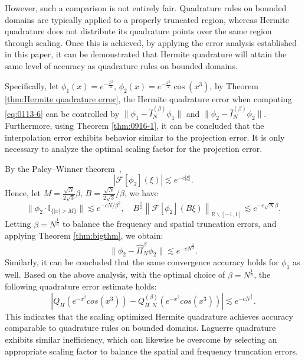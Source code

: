\documentclass[pdflatex,sn-aps]{sn-jnl}%
\theoremstyle{thmstyleone}%
\theoremstyle{thmstyletwo}%
\theoremstyle{thmstylethree}%
\begin{document}
However, such a comparison is not entirely fair. 
Quadrature rules on bounded domains are typically applied to a properly truncated region, 
whereas Hermite quadrature does not distribute its quadrature points over the same region through scaling.
Once this is achieved, by applying the error analysis established in this paper, 
it can be demonstrated that Hermite quadrature will attain the same level of accuracy as quadrature rules on bounded domains.

Specifically, let $\phi_1(x) = e^{-\frac{x^2}{2}}$, $\phi_2(x) = e^{-\frac{x^2}{2}} \cos(x^3)$, 
by Theorem \ref{thm:Hermite quadrature error}, the Hermite quadrature error when computing
\eqref{eq:0113-6} can be controlled by $\bigl\|\phi_1-\widehat{I}_N^{(\beta)} \phi_1\bigr\|$ and $\bigl\|\phi_2-\widehat{I}_N^{(\beta)} \phi_2\bigr\|$.
Furthermore, using Theorem \ref{thm:0916-1}, it can be concluded that 
the interpolation error exhibits behavior similar to the projection error. 
It is only necessary to analyze the optimal scaling factor for the projection error.

By the Paley--Winner theorem~\cite{paley1934fourier},
\begin{equation}\label{eq:0113-7}
  \left|\mathcal{F}[\phi_2](\xi)\right| \lesssim e^{-c|\xi|}.
\end{equation}
Hence, let $M = \frac{\sqrt{N}}{2\sqrt{3}}\beta,\, B = \frac{\sqrt{N}}{2\sqrt{3}}/\beta$, we have
\begin{equation}\label{eq:0113-8}
  \bigl\|\phi_2 \cdot \mathbb{I}_{\{|x|>M\}}\bigr\| \lesssim e^{-c N / \beta^2}, 
  \quad B^{\frac{1}{2}} \left\| \mathcal{F}\left[\phi_2\right](B\xi) \right\|_{\mathbb{R} \backslash[-1,1]} \lesssim e^{-c \sqrt{N} \beta}.
\end{equation}
Letting $\beta = N^{\frac{1}{6}}$ to balance the frequency and spatial truncation errors, and applying Theorem \ref{thm:bigthm}, we obtain:
\begin{equation}\label{eq:0113-9}
  \bigl\|\phi_2-\widehat{\Pi}_N^\beta \phi_2\bigr\| \lesssim e^{-cN^{\frac{2}{3}}}.
\end{equation}
Similarly, it can be concluded that the same convergence accuracy holds for $\phi_1$ as well.
Based on the above analysis, with the optimal choice of $\beta = N^{\frac{1}{6}}$, the following quadrature error estimate holds:
\begin{equation}\label{eq:0113-10}
  \left|Q_H\left(e^{-x^2}cos(x^3)\right)-Q_{H, N}^{(\beta)}\left(e^{-x^2}cos(x^3)\right)\right| \lesssim e^{-cN^{\frac{2}{3}}}.
\end{equation}
This indicates that the scaling optimized Hermite quadrature achieves accuracy comparable to quadrature rules on bounded domains.
Laguerre quadrature exhibits similar inefficiency, which can likewise be overcome by selecting an appropriate scaling factor to balance the spatial and frequency truncation errors.
\end{document}
